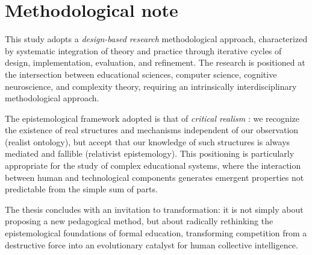 \section{Methodological note}

This study adopts a \textit{design-based research} methodological approach, characterized by systematic integration of theory and practice through iterative cycles of design, implementation, evaluation, and refinement. The research is positioned at the intersection between educational sciences, computer science, cognitive neuroscience, and complexity theory, requiring an intrinsically interdisciplinary methodological approach.

The epistemological framework adopted is that of \textit{critical realism} \cite{Bhaskar2008}: we recognize the existence of real structures and mechanisms independent of our observation (realist ontology), but accept that our knowledge of such structures is always mediated and fallible (relativist epistemology). This positioning is particularly appropriate for the study of complex educational systems, where the interaction between human and technological components generates emergent properties not predictable from the simple sum of parts.

The thesis concludes with an invitation to transformation: it is not simply about proposing a new pedagogical method, but about radically rethinking the epistemological foundations of formal education, transforming competition from a destructive force into an evolutionary catalyst for human collective intelligence.